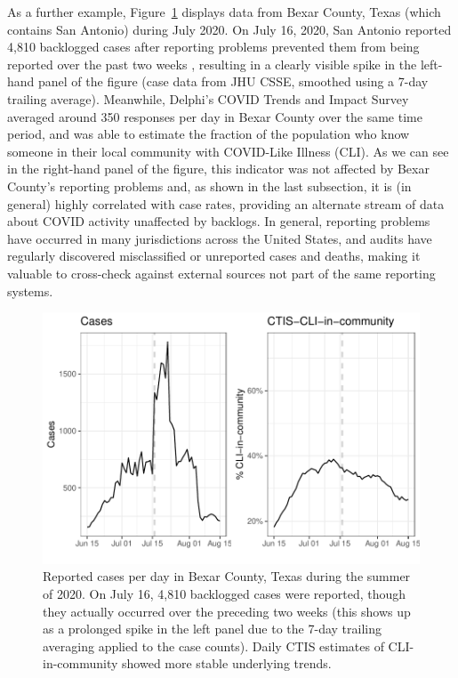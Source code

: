 \documentclass[9pt,twocolumn,twoside,lineno]{pnas-new}
\begin{document}
As a further example, Figure~\ref{fig:bexar_compare} displays data from Bexar
County, Texas (which contains San Antonio) during July 2020. On July 16, 2020,
San Antonio reported 4,810 backlogged cases after reporting problems prevented
them from being reported over the past two weeks \cite{Palacios:2021}, resulting
in a clearly visible spike in the left-hand panel of the figure (case data from
JHU CSSE, smoothed using a 7-day trailing average). Meanwhile, Delphi's COVID
Trends and Impact Survey averaged around 350 responses per day in Bexar County
over the same time period, and was able to estimate the fraction of the
population who know someone in their local community with COVID-Like Illness
(CLI). As we can see in the right-hand panel of the figure, this indicator was 
not affected by Bexar County's reporting problems and, as shown in the last 
subsection, it is (in general) highly correlated with case rates, providing an
alternate stream of data about COVID activity unaffected by backlogs. In
general, reporting problems have occurred in many jurisdictions across the
United States, and audits have regularly discovered misclassified or unreported
cases and deaths, making it valuable to cross-check against external sources not
part of the same reporting systems.

\begin{figure}[t]
  \includegraphics[width=\columnwidth]{fig/bexar_compare.pdf}
  \caption{Reported cases per day in Bexar County, Texas during the summer of
    2020. On July 16, 4,810 backlogged cases were reported, though they actually
    occurred over the preceding two weeks (this shows up as a prolonged spike in
    the left panel due to the 7-day trailing averaging applied to the case
    counts). Daily CTIS estimates of CLI-in-community showed more stable
    underlying trends.}
  \label{fig:bexar_compare}
\end{figure}
\end{document}
